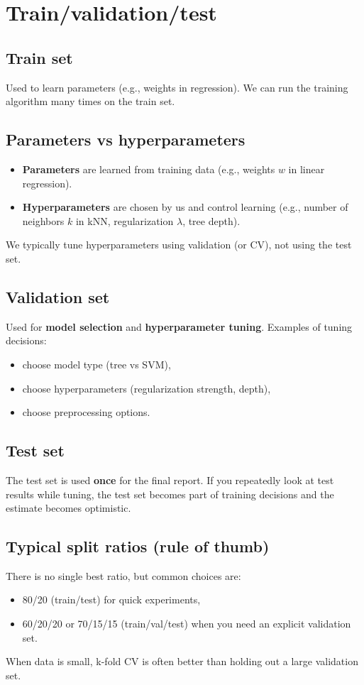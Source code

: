 \documentclass[11pt]{article}
\begin{document}
\section{Train/validation/test}
\subsection{Train set}
Used to learn parameters (e.g., weights in regression). We can run the training algorithm many times on the train set.

\subsection{Parameters vs hyperparameters}
\begin{itemize}[leftmargin=*]
  \item \textbf{Parameters} are learned from training data (e.g., weights $w$ in linear regression).
  \item \textbf{Hyperparameters} are chosen by us and control learning (e.g., number of neighbors $k$ in kNN, regularization $\lambda$, tree depth).
\end{itemize}
We typically tune hyperparameters using validation (or CV), not using the test set.

\subsection{Validation set}
Used for \textbf{model selection} and \textbf{hyperparameter tuning}. Examples of tuning decisions:
\begin{itemize}[leftmargin=*]
  \item choose model type (tree vs SVM),
  \item choose hyperparameters (regularization strength, depth),
  \item choose preprocessing options.
\end{itemize}

\subsection{Test set}
The test set is used \textbf{once} for the final report. If you repeatedly look at test results while tuning, the test set becomes part of training decisions and the estimate becomes optimistic.

\subsection{Typical split ratios (rule of thumb)}
There is no single best ratio, but common choices are:
\begin{itemize}[leftmargin=*]
  \item 80/20 (train/test) for quick experiments,
  \item 60/20/20 or 70/15/15 (train/val/test) when you need an explicit validation set.
\end{itemize}
When data is small, k-fold CV is often better than holding out a large validation set.
\end{document}
